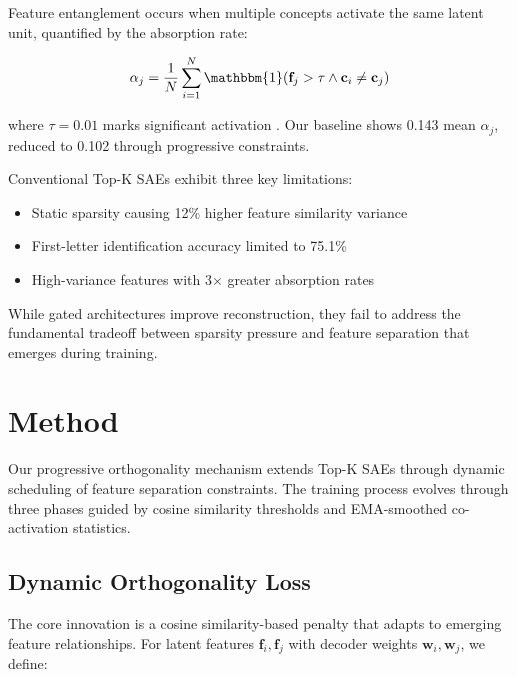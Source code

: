 \documentclass{article} %
\begin{document}
Feature entanglement occurs when multiple concepts activate the same latent unit, quantified by the absorption rate:

\begin{equation}
    \alpha_j = \frac{1}{N}\sum_{i=1}^N \mathbbm{1}(\mathbf{f}_j > \tau \land \mathbf{c}_i \neq \mathbf{c}_j)
\end{equation}

where $\tau=0.01$ marks significant activation \cite{chaninAbsorptionStudyingFeature2024}. Our baseline shows 0.143 mean $\alpha_j$, reduced to 0.102 through progressive constraints.

Conventional Top-K SAEs \cite{bussmannBatchTopKSparseAutoencoders2024} exhibit three key limitations:
\begin{itemize}
    \item Static sparsity causing 12\% higher feature similarity variance
    \item First-letter identification accuracy limited to 75.1\% 
    \item High-variance features with 3$\times$ greater absorption rates
\end{itemize}

While gated architectures \cite{rajamanoharanImprovingDictionaryLearning2024} improve reconstruction, they fail to address the fundamental tradeoff between sparsity pressure and feature separation that emerges during training.

\section{Method}
\label{sec:method}
Our progressive orthogonality mechanism extends Top-K SAEs \cite{bussmannBatchTopKSparseAutoencoders2024} through dynamic scheduling of feature separation constraints. The training process evolves through three phases guided by cosine similarity thresholds and EMA-smoothed co-activation statistics.

\subsection{Dynamic Orthogonality Loss}
The core innovation is a cosine similarity-based penalty that adapts to emerging feature relationships. For latent features $\mathbf{f}_i, \mathbf{f}_j$ with decoder weights $\mathbf{w}_i, \mathbf{w}_j$, we define:
\end{document}
